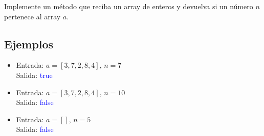 Implemente un método que reciba un array de enteros y devuelva si un número \(n\) pertenece al array \(a\).
\subsection*{Ejemplos}
\begin{itemize}
    \item Entrada: \( a = [3, 7, 2, 8, 4], \, n = 7 \)\\
    Salida: \textcolor{blue}{true} 
    
    \item Entrada: \( a = [3, 7, 2, 8, 4], \, n = 10 \)\\
    Salida: \textcolor{blue}{false}
    
    \item Entrada: \( a = [], \, n = 5 \)\\
    Salida: \textcolor{blue}{false}
\end{itemize}